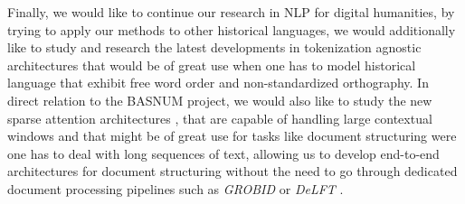 Finally, we would like to continue our research in NLP for digital humanities, by trying to apply our methods to other historical languages, we would additionally like to study and research the latest developments in tokenization agnostic architectures \citep{clark-etal-2021-canine,xue-etal-2021-byt5} that would be of great use when one has to model historical language that exhibit free word order and non-standardized orthography. In direct relation to the BASNUM project, we would also like to study the new sparse attention architectures \cite{xiong-etal-2021-nystromformer,beltagy-etal-2020-longformer}, that are capable of handling large contextual windows and that might be of great use for tasks like document structuring were one has to deal with long sequences of text, allowing us to develop end-to-end architectures for document structuring without the need to go through dedicated document processing pipelines such as \emph{GROBID} \citep{lopez-etal-2018-grobid} or \emph{DeLFT} \citep{lopez-etal-2018-delft}.
